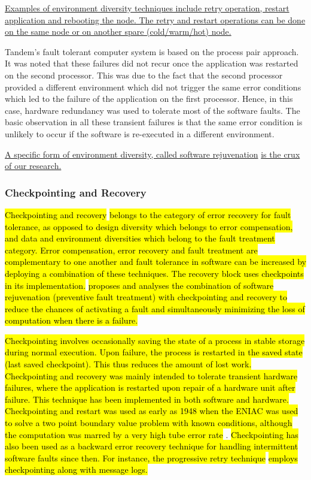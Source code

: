 \documentclass[a4paper, 11pt]{article}
\begin{document}
\ul{Examples of environment diversity techniques include retry operation, restart application and rebooting the node. The retry and restart operations can be done on the same node or on another spare (cold/warm/hot) node.}

Tandem's fault tolerant computer system \citep{lee1995software} is based on the process pair approach. It was noted that these failures did not recur once the application was restarted on the second processor. This was due to the fact that the second processor provided a different environment which did not trigger the same error conditions which led to the failure of the application on the first processor. Hence, in this case, hardware redundancy was used to tolerate most of the software faults. The basic observation in all these transient failures is that the same error condition is unlikely to occur if the software is re-executed in a different environment.

\ul{A specific form of environment diversity, called software rejuvenation} \citep{castelli2001proactive,garg1998methodology,huang1995software} \ul{is the crux of our research.}

\subsubsection{Checkpointing and Recovery}
\hl{Checkpointing and recovery} \citep{chandy1975analytic, kulkarni1990effects, long1992implementing, pradhan1994roll} \hl{belongs to the category of error recovery for fault tolerance, as opposed to design diversity which belongs to error compensation, and data and environment diversities which belong to the fault treatment category. Error compensation, error recovery and fault treatment are complementary to one another and fault tolerance in software can be increased by deploying a combination of these techniques. The recovery block uses checkpoints in its implementation.} \citet{garg1996minimizing} \hl{proposes and analyses the combination of software rejuvenation (preventive fault treatment) with checkpointing and recovery to reduce the chances of activating a fault and simultaneously minimizing the loss of computation when there is a failure.}

\hl{Checkpointing involves occasionally saving the state of a process in stable storage during normal execution. Upon failure, the process is restarted in the saved state (last saved checkpoint). This thus reduces the amount of lost work. Checkpointing and recovery was mainly intended to tolerate transient hardware failures, where the application is restarted upon repair of a hardware unit after failure. This technique has been implemented in both software and hardware. Checkpointing and restart was used as early as 1948 when the ENIAC was used to solve a two point boundary value problem with known conditions, although the computation was marred by a very high tube error rate} \citep{avizienis2012evolution}. \hl{Checkpointing has also been used as a backward error recovery technique for handling intermittent software faults since then. For instance, the progressive retry technique} \citep{wang1995checkpointing} \hl{employs checkpointing along with message logs.}
\end{document}

